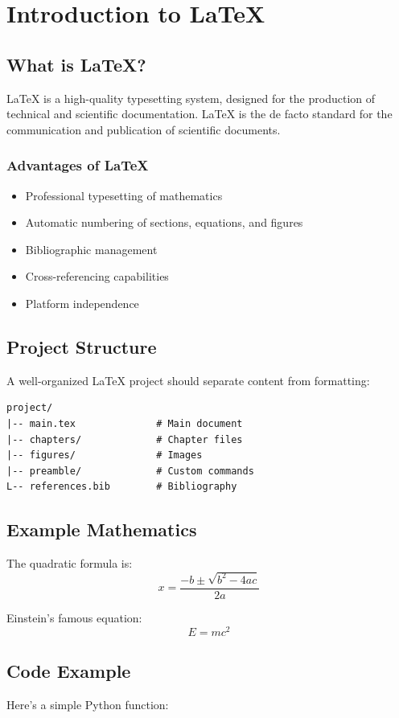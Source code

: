 \chapter{Introduction to LaTeX}

\section{What is LaTeX?}
\LaTeX{} is a high-quality typesetting system, designed for the production 
of technical and scientific documentation. \LaTeX{} is the de facto standard 
for the communication and publication of scientific documents.

\subsection{Advantages of LaTeX}
\begin{itemize}
    \item Professional typesetting of mathematics
    \item Automatic numbering of sections, equations, and figures
    \item Bibliographic management
    \item Cross-referencing capabilities
    \item Platform independence
\end{itemize}

\section{Project Structure}
A well-organized LaTeX project should separate content from formatting:

\begin{verbatim}
project/
|-- main.tex              # Main document
|-- chapters/             # Chapter files
|-- figures/              # Images
|-- preamble/             # Custom commands
L-- references.bib        # Bibliography
\end{verbatim}

\section{Example Mathematics}
The quadratic formula is:
\[
x = \frac{-b \pm \sqrt{b^2 - 4ac}}{2a}
\]

Einstein's famous equation:
\[
E = mc^2
\]

\section{Code Example}
Here's a simple Python function:

